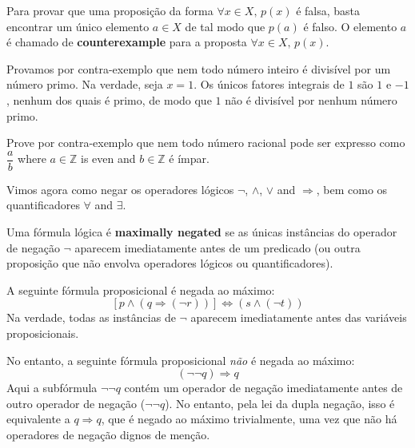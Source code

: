 \begin{strategy}
\label{strCounterexample}
Para provar que uma proposição da forma $\forall x \in X,\, p(x)$ é falsa, basta encontrar um único elemento $a \in X$ de tal modo que $p(a)$ é falso. O elemento $a$ é chamado de \textbf{counterexample} para a proposta $\forall x \in X,\, p(x)$.
\end{strategy}

\begin{example}
Provamos por contra-exemplo que nem todo número inteiro é divisível por um número primo. Na verdade, seja $x = 1$. Os únicos fatores integrais de $1$ são $1$ e $-1$, nenhum dos quais é primo, de modo que $1$ não é divisível por nenhum número primo.
\end{example}

\begin{exercise}
Prove por contra-exemplo que nem todo número racional pode ser expresso como $\dfrac{a}{b}$ where $a \in \mathbb{Z}$ is even and $b \in \mathbb{Z}$ é ímpar.
\end{exercise}

Vimos agora como negar os operadores lógicos $\neg$, $\wedge$, $\vee$ and $\Rightarrow$, bem como os quantificadores $\forall$ and $\exists$. 

\begin{definition}
\label{defMaximallyNegatedLogicalFormula}
Uma fórmula lógica é \textbf{maximally negated} se as únicas instâncias do operador de negação $\neg$ aparecem imediatamente antes de um predicado (ou outra proposição que não envolva operadores lógicos ou quantificadores).
\end{definition}

\begin{example}
A seguinte fórmula proposicional é negada ao máximo:
\[ [p \wedge (q \Rightarrow (\neg r))] \Leftrightarrow (s \wedge (\neg t))\]
Na verdade, todas as instâncias de $\neg$ aparecem imediatamente antes das variáveis ​​proposicionais.

No entanto, a seguinte fórmula proposicional \textit{não} é negada ao máximo:
\[ (\neg \neg q) \Rightarrow q\]
Aqui a subfórmula $\neg \neg q$ contém um operador de negação imediatamente antes de outro operador de negação ($\neg \neg q$). No entanto, pela lei da dupla negação, isso é equivalente a $q \Rightarrow q$, que é negado ao máximo trivialmente, uma vez que não há operadores de negação dignos de menção.
\end{example}


